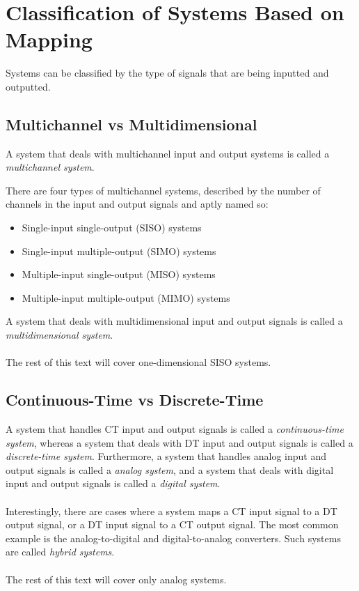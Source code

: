 \documentclass{report}
\begin{document}
\section{Classification of Systems Based on Mapping}
Systems can be classified by the type of signals that are being inputted and outputted.

\subsection{Multichannel vs Multidimensional}
A system that deals with multichannel input and output systems is called a \emph{multichannel system}. 
\begin{tcolorbox}[width=\textwidth,colback={white}, sharp corners]
    There are four types of multichannel systems, described by the number 
    of channels in the input and output signals and aptly named so:
    \begin{itemize}
        \item Single-input single-output (SISO) systems
        \item Single-input multiple-output (SIMO) systems
        \item Multiple-input single-output (MISO) systems
        \item Multiple-input multiple-output (MIMO) systems
    \end{itemize}
\end{tcolorbox}
\noindent A system that deals with multidimensional input and output signals is called a \emph{multidimensional system}. 
\\ \\
The rest of this text will cover one-dimensional SISO systems.

\subsection{Continuous-Time vs Discrete-Time}
A system that handles CT input and output signals is called a \emph{continuous-time system}, whereas a system that deals with DT input and output signals 
is called a \emph{discrete-time system}. Furthermore, a system that handles analog input and output signals is called a \emph{analog system}, and a system 
that deals with digital input and output signals is called a \emph{digital system}. 
\\ \\
Interestingly, there are cases where a system maps a CT input signal to a DT output signal, or a DT input signal to a CT output signal. The most common example is 
the analog-to-digital and digital-to-analog converters. Such systems are called \emph{hybrid systems}.
\\ \\
The rest of this text will cover only analog systems.
\end{document}
